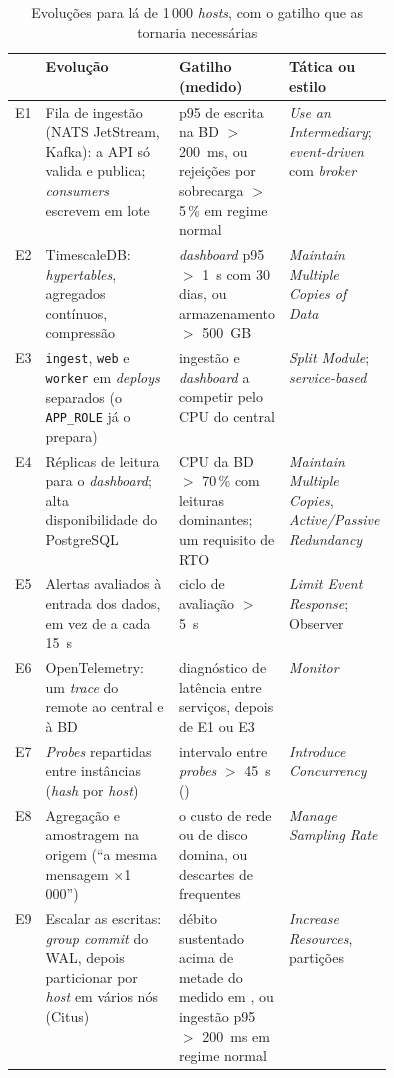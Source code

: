 \begin{table}[htbp]
  \centering\small
  \caption{Evoluções para lá de 1\,000 \emph{hosts}, com o gatilho que as tornaria necessárias}
  \label{tab:evolucao}
  \begin{tabularx}{\linewidth}{lYL{0.27\linewidth}L{0.17\linewidth}}
    \toprule
    & Evolução & Gatilho (medido) & Tática ou estilo \\
    \midrule
    E1 & Fila de ingestão (NATS JetStream, Kafka): a API só valida e publica; \emph{consumers} escrevem em lote & p95 de escrita na BD $>$ 200~ms, ou rejeições por sobrecarga $>$ 5\,\% em regime normal & \emph{Use an Intermediary}; \emph{event-driven} com \emph{broker} \\
    E2 & TimescaleDB: \emph{hypertables}, agregados contínuos, compressão & \emph{dashboard} p95 $>$ 1~s com 30 dias, ou armazenamento $>$ 500~GB & \emph{Maintain Multiple Copies of Data} \\
    E3 & \texttt{ingest}, \texttt{web} e \texttt{worker} em \emph{deploys} separados (o \texttt{APP\_ROLE} já o prepara) & ingestão e \emph{dashboard} a competir pelo CPU do central & \emph{Split Module}; \emph{service-based} \\
    E4 & Réplicas de leitura para o \emph{dashboard}; alta disponibilidade do PostgreSQL & CPU da BD $>$ 70\,\% com leituras dominantes; um requisito de RTO & \emph{Maintain Multiple Copies}, \emph{Active/Passive Redundancy} \\
    E5 & Alertas avaliados à entrada dos dados, em vez de a cada 15~s & ciclo de avaliação $>$ 5~s & \emph{Limit Event Response}; Observer \\
    E6 & OpenTelemetry: um \emph{trace} do remote ao central e à BD & diagnóstico de latência entre serviços, depois de E1 ou E3 & \emph{Monitor} \\
    E7 & \emph{Probes} repartidas entre instâncias (\emph{hash} por \emph{host}) & intervalo entre \emph{probes} $>$ 45~s () & \emph{Introduce Concurrency} \\
    E8 & Agregação e amostragem na origem (``a mesma mensagem $\times$1\,000'') & o custo de rede ou de disco domina, ou descartes de  frequentes & \emph{Manage Sampling Rate} \\
    E9 & Escalar as escritas: \emph{group commit} do WAL, depois particionar por \emph{host} em vários nós (Citus) & débito sustentado acima de metade do medido em , ou ingestão p95 $>$ 200~ms em regime normal & \emph{Increase Resources}, partições \\

\end{tabularx}
\end{table}
